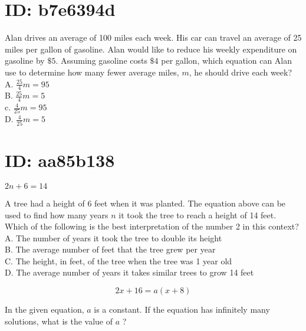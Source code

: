 \section*{ID: b7e6394d}
Alan drives an average of 100 miles each week. His car can travel an average of 25 miles per gallon of gasoline. Alan would like to reduce his weekly expenditure on gasoline by $\$ 5$. Assuming gasoline costs $\$ 4$ per gallon, which equation can Alan use to determine how many fewer average miles, $m$, he should drive each week?\\
A. $\frac{25}{4} m=95$\\
B. $\frac{25}{4} m=5$\\
c. $\frac{4}{25} m=95$\\
D. $\frac{4}{25} m=5$












\section*{ID: aa85b138}
$2 n+6=14$

A tree had a height of 6 feet when it was planted. The equation above can be used to find how many years $n$ it took the tree to reach a height of 14 feet. Which of the following is the best interpretation of the number 2 in this context?\\
A. The number of years it took the tree to double its height\\
B. The average number of feet that the tree grew per year\\
C. The height, in feet, of the tree when the tree was 1 year old\\
D. The average number of years it takes similar trees to grow 14 feet













$$
2 x+16=a(x+8)
$$

In the given equation, $a$ is a constant. If the 
equation has infinitely many solutions, what is the value of $a$ ?











